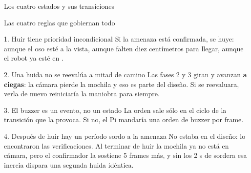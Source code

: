 \begin{frame}{Los cuatro estados y sus transiciones}
  \vspace{0.5em}
\end{frame}

\begin{frame}{Las cuatro reglas que gobiernan todo}
  \begin{block}{1. Huir tiene prioridad incondicional}
    {\small Si la amenaza está confirmada, se huye: aunque el oso esté a la vista,
    aunque falten diez centímetros para llegar, aunque el robot ya esté en
    .}
  \end{block}
  \begin{block}{2. Una huida no se reevalúa a mitad de camino}
    {\small Las fases 2 y 3 giran y avanzan \textbf{a ciegas}: la cámara pierde la
    mochila y eso es parte del diseño. Si se reevaluara, verla de nuevo
    reiniciaría la maniobra para siempre.}
  \end{block}
  \begin{block}{3. El buzzer es un evento, no un estado}
    {\small La orden sale sólo en el ciclo de la transición que la provoca. Si no, el
    Pi mandaría una orden de buzzer por frame.}
  \end{block}
  \begin{block}{4. Después de huir hay un período sordo a la amenaza}
    {\small No estaba en el diseño: lo encontraron las verificaciones. Al terminar de
    huir la mochila ya no está en cámara, pero el confirmador la sostiene 5
    frames más, y sin los 2 s de sordera esa inercia dispara una segunda huida
    idéntica.}
  \end{block}
\end{frame}

